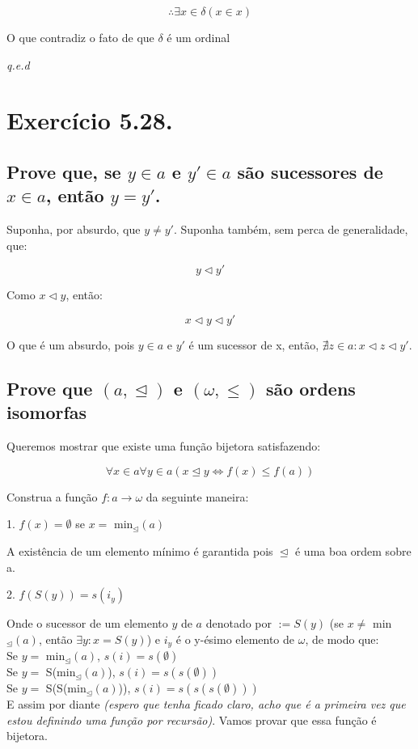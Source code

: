 \documentclass[12pt]{extarticle}
\newcommand{\fim}{\begin{flushright}

   \emph{q.e.d}
\end{flushright}}
\begin{document}
$$
\therefore \exists x \in \delta (x \in x)
$$

O que contradiz o fato de que $\delta$ é um ordinal

\fim

\section{Exercício 5.28.}

\subsection{Prove que, se $y \in a$ e $y'\in a$ são sucessores de $x \in a$, então $y = y'$.}

Suponha, por absurdo, que $y \neq y'$. Suponha também, sem perca de generalidade, que:


$$
y \triangleleft y'
$$

Como $x \triangleleft y$, então:

$$
x \triangleleft y \triangleleft y'
$$

O que é um absurdo, pois $y \in a$ e $y'$ é um sucessor de x, então, $\nexists z \in a : x \triangleleft z \triangleleft y'$.

\subsection{Prove que $(a, \trianglelefteq)$ e $(\omega, \leq)$ são ordens isomorfas}

Queremos mostrar que existe uma função bijetora satisfazendo:

$$
\forall x \in a \forall y \in a (x \trianglelefteq y \Leftrightarrow f(x) \leq f(a))
$$

Construa a função $f: a \rightarrow \omega$ da seguinte maneira:

1. $f(x) = \emptyset$ se $x =$ min$_{\trianglelefteq}(a)$

A existência de um elemento mínimo é garantida pois $\trianglelefteq$ é uma boa ordem sobre a.

2. $f(S(y)) = s(i_y)$

Onde o sucessor de um elemento $y$ de $a$ denotado por $ := S(y)$ (se $x \neq$ min$_{\trianglelefteq}(a)$, então $\exists y : x = S(y)$) e $i_y$ é o y-ésimo elemento de $\omega$, de modo que:
\\
Se $y = $ min$_{\trianglelefteq}(a)$, $s(i) = s(\emptyset)$ \\
Se $y =$ S(min$_{\trianglelefteq}(a)$), $s(i) = s(s(\emptyset))$\\
Se $y =$ S(S(min$_{\trianglelefteq}(a)$)), $s(i) = s(s(s(\emptyset)))$\\
E assim por diante \textit{(espero que tenha ficado claro, acho que é a primeira vez que estou definindo uma função por recursão)}. Vamos provar que essa função é bijetora.
\end{document}
